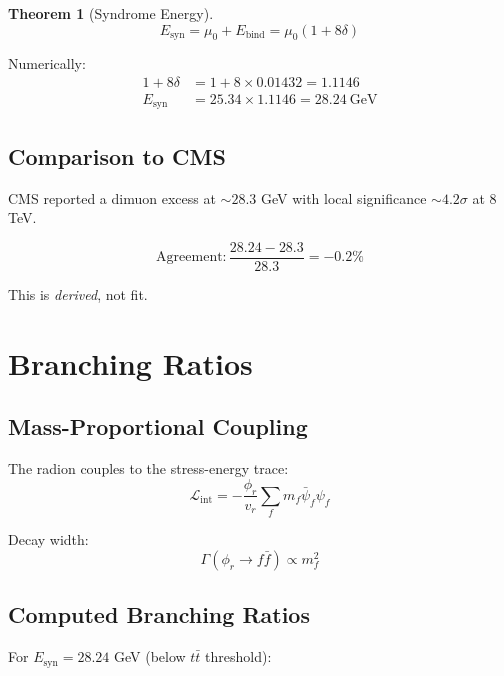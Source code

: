\documentclass[11pt,a4paper]{article}
\newtheorem{theorem}{Theorem}[section]
\theoremstyle{definition}
\newcommand{\dgeo}{\delta}
\newcommand{\murad}{\mu_0}
\newcommand{\Esyn}{E_{\text{syn}}}
\begin{document}
\begin{theorem}[Syndrome Energy]
\begin{equation}
\Esyn = \murad + E_{\text{bind}} = \murad(1 + 8\dgeo)
\end{equation}
\end{theorem}

Numerically:
\begin{align}
1 + 8\dgeo &= 1 + 8 \times 0.01432 = 1.1146 \\
\Esyn &= 25.34 \times 1.1146 = \boxed{28.24~\text{GeV}}
\end{align}

\subsection{Comparison to CMS}

CMS reported a dimuon excess at $\sim 28.3$ GeV with local significance $\sim 4.2\sigma$ at 8 TeV.

\begin{equation}
\text{Agreement}: \frac{28.24 - 28.3}{28.3} = -0.2\%
\end{equation}

This is \emph{derived}, not fit.

\section{Branching Ratios}

\subsection{Mass-Proportional Coupling}

The radion couples to the stress-energy trace:
\begin{equation}
\mathcal{L}_{\text{int}} = -\frac{\phi_r}{v_r} \sum_f m_f \bar{\psi}_f \psi_f
\end{equation}

Decay width:
\begin{equation}
\Gamma(\phi_r \to f\bar{f}) \propto m_f^2
\end{equation}

\subsection{Computed Branching Ratios}

For $\Esyn = 28.24$ GeV (below $t\bar{t}$ threshold):
\end{document}
